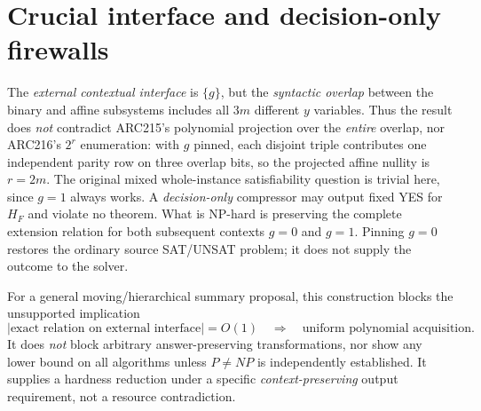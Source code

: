 \documentclass[11pt]{article}
\begin{document}
\section{Crucial interface and decision-only firewalls}
The \emph{external contextual interface} is $\{g\}$, but the \emph{syntactic overlap} between the binary and affine subsystems includes all $3m$ different $y$ variables. Thus the result does \emph{not} contradict ARC215's polynomial projection over the \emph{entire} overlap, nor ARC216's $2^r$ enumeration: with $g$ pinned, each disjoint triple contributes one independent parity row on three overlap bits, so the projected affine nullity is $r=2m$. The original mixed whole-instance satisfiability question is trivial here, since $g=1$ always works. A \emph{decision-only} compressor may output fixed YES for $H_F$ and violate no theorem. What is NP-hard is preserving the complete extension relation for both subsequent contexts $g=0$ and $g=1$. Pinning $g=0$ restores the ordinary source SAT/UNSAT problem; it does not supply the outcome to the solver.

For a general moving/hierarchical summary proposal, this construction blocks the unsupported implication
\[
 \bigl|\text{exact relation on external interface}\bigr|=O(1)
 \quad\Longrightarrow\quad \text{uniform polynomial acquisition}.
\]
It does \emph{not} block arbitrary answer-preserving transformations, nor show any lower bound on all algorithms unless $P\neq NP$ is independently established. It supplies a hardness reduction under a specific \emph{context-preserving} output requirement, not a resource contradiction.
\end{document}
